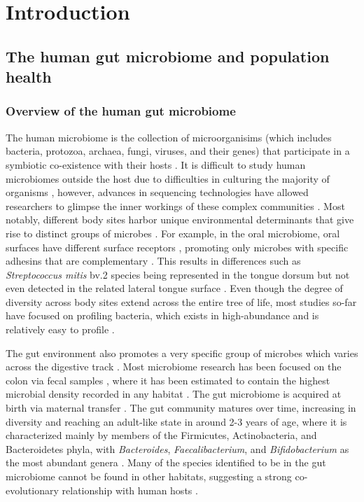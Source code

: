 \chapter{Introduction}

\section{The human gut microbiome and population health}
\subsection{Overview of the human gut microbiome}

The human microbiome is the collection of microorganisims (which includes bacteria, protozoa, archaea, fungi, viruses, and their genes) that participate in a symbiotic co-existence with their hosts \cite{ursell2012defining}. It is difficult to study human microbiomes outside the host due to difficulties in culturing the majority of organisms \cite{walker2014phylogeny}, however, advances in sequencing technologies have allowed researchers to glimpse the inner workings of these complex communities \cite{zuniga2017elucidation}. Most notably, different body sites harbor unique environmental determinants that give rise to distinct groups of microbes \cite{consortium2012structure}. For example, in the oral microbiome, oral surfaces have different surface receptors \cite{gibbons1989bacterial}, promoting only microbes with specific adhesins that are complementary \cite{aas2005defining}. This results in differences such as \emph{Streptococcus mitis} bv.2 species being represented in the tongue dorsum but not even detected in the related lateral tongue surface \cite{aas2005defining}. Even though the degree of diversity across body sites extend across the entire tree of life, most studies so-far have focused on profiling bacteria, which exists in high-abundance and is relatively easy to profile \cite{cani2018human}. 

The gut environment also promotes a very specific group of microbes which varies across the digestive track \cite{mailhe2018repertoire, donaldson2016gut}. Most microbiome research has been focused on the colon via fecal samples \cite{tang2020current}, where it has been estimated to contain the highest microbial density recorded in any habitat \cite{shapira2016gut}. The gut microbiome is acquired at birth via maternal transfer \cite{shao2019stunted, backhed2015dynamics, yassour2016natural}. The gut community matures over time, increasing in diversity and reaching an adult-like state in around 2-3 years of age, where it is characterized mainly by members of the Firmicutes, Actinobacteria, and Bacteroidetes phyla, with \emph{Bacteroides}, \emph{Faecalibacterium}, and \emph{Bifidobacterium} as the most abundant genera \cite{king2019baseline, metahitconsortiumadditionalmembers2011enterotypes}. Many of the species identified to be in the gut microbiome cannot be found in other habitats, suggesting a strong co-evolutionary relationship with human hosts \cite{ley2006ecological}.  

